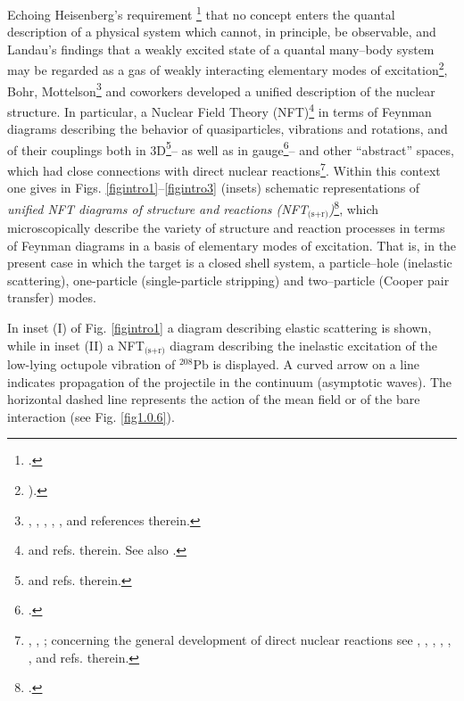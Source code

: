 Echoing Heisenberg's requirement \footnote{\cite{Heisenberg:49}.} that no concept enters the quantal description of a physical system which cannot, in principle, be observable, and Landau's findings that a weakly excited state of a quantal many--body system may be regarded as a gas of weakly interacting elementary modes of excitation\footnote{\cite{Landau:41}).}, Bohr, Mottelson\footnote{\cite{Bohr:64}, \cite{Bohr:69}, \cite{Bohr:76}, \cite{Mottelson:76}, \cite{Bohr:75}, \cite{Bohr:58} and references therein.} and coworkers developed a unified description of the nuclear  structure. In particular, a Nuclear Field Theory (NFT)\footnote{\cite{Bes:74,Broglia:76,Bohr:75,Bes:90,Mottelson:76} and refs. therein. See also \cite{Bohr:19}.} in terms of Feynman diagrams describing the behavior of quasiparticles, vibrations and rotations, and of their couplings both in 3D\footnote{\cite{Nilsson:55,Bohr:75} and refs. therein.}-- as well as in gauge\footnote{\cite{Bohr:58,Belyaev:59,Hogassen:61,Bes:66,Bjerregaard:66b,Broglia:67,Bohr:75}.}-- and other ``abstract'' spaces, which had  close connections with direct nuclear reactions\footnote{ \cite{Alder:56}, \cite{Alder:75}, \cite{Broglia:04a}; concerning the general development of direct nuclear reactions see \cite{Austern:70}, \cite{Jackson:70}, \cite{Satchler:80}, \cite{Satchler:83}, \cite{Brink:85}, \cite{Glendenning:04,Thompson:09}, and refs. therein.}. Within this context one gives in Figs. \ref{figintro1}--\ref{figintro3} (insets)  schematic representations of  \textit{unified NFT diagrams of structure and reactions (NFT$_{\text{(s+r)}}$)}\footnote{\cite{Broglia:75,Broglia:04a,Potel:13,Broglia:16}.}, which microscopically describe the variety of structure and reaction processes in terms of Feynman diagrams in a basis of elementary modes of excitation. That is, in the present case in which the target is a closed shell system, a particle--hole (inelastic scattering), one-particle (single-particle stripping) and two--particle (Cooper pair transfer) modes. 

In inset (I) of Fig. \ref{figintro1} a diagram describing elastic scattering is shown, while in inset (II) a NFT$_{\text{(s+r)}}$ diagram describing the inelastic excitation of the low-lying octupole vibration of $^{208}$Pb is displayed. A  curved arrow on a line indicates propagation of  the projectile in the continuum  (asymptotic waves). The horizontal dashed line represents the action of the mean field or of the  bare interaction (see Fig. \ref{fig1.0.6}). 


